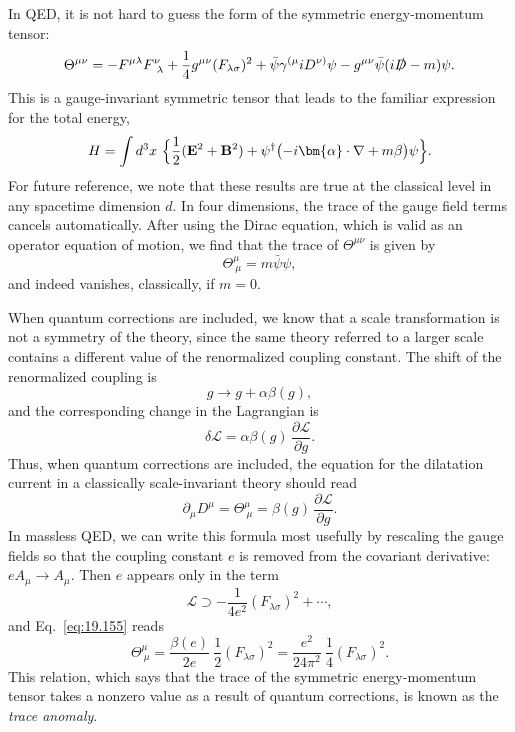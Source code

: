 In QED, it is not hard to guess the form of the symmetric energy-momentum
tensor:
\begin{equation}
  \Theta^{\mu\nu} = -F^{\mu\lambda}F^{\nu}_{\ \lambda}
    + \frac{1}{4}g^{\mu\nu}(F_{\lambda\sigma})^2
    + \bar{\psi}\gamma^{(\mu}iD^{\nu)}\psi
    - g^{\mu\nu}\bar{\psi}(i\slashed{D} - m)\psi .
  \label{eq:19.150}
\end{equation}
This is a gauge-invariant symmetric tensor that leads to the familiar
expression for the total energy,
\begin{equation}
  H = \int d^3x\ \Bigl\{ \frac{1}{2}(\mathbf{E}^2 + \mathbf{B}^2)
    + \psi^{\dagger}\bigl( -i\bm{\alpha}\cdot\nabla + m\beta \bigr)\psi
    \Bigr\} .
  \label{eq:19.151}
\end{equation}
For future reference, we note that these results are true at the classical
level in any spacetime dimension $d$.  In four dimensions, the trace of the
gauge field terms cancels automatically.  After using the Dirac equation,
which is valid as an operator equation of motion, we find that the trace of
$\Theta^{\mu\nu}$ is given by
\begin{equation}
  \Theta^\mu_{\ \mu} = m\bar{\psi}\psi ,
  \label{eq:19.152}
\end{equation}
and indeed vanishes, classically, if $m = 0$.

When quantum corrections are included, we know that a scale transformation is
not a symmetry of the theory, since the same theory referred to a larger
scale contains a different value of the renormalized coupling constant.  The
shift of the renormalized coupling is
\begin{equation}
  g \to g + \alpha\beta(g) ,
  \label{eq:19.153}
\end{equation}
and the corresponding change in the Lagrangian is
\begin{equation}
  \delta\mathcal{L} = \alpha\beta(g)\,\frac{\partial\mathcal{L}}
    {\partial g} .
  \label{eq:19.154}
\end{equation}
Thus, when quantum corrections are included, the equation for the dilatation
current in a classically scale-invariant theory should read
\begin{equation}
  \partial_\mu D^\mu = \Theta^\mu_{\ \mu} = \beta(g)\,\frac{\partial
    \mathcal{L}}{\partial g} .
  \label{eq:19.155}
\end{equation}
In massless QED, we can write this formula most usefully by rescaling the
gauge fields so that the coupling constant $e$ is removed from the covariant
derivative: $eA_\mu\to A_\mu$.  Then $e$ appears only in the term
\begin{equation}
  \mathcal{L} \supset -\frac{1}{4e^2}(F_{\lambda\sigma})^2 + \cdots ,
  \label{eq:19.156}
\end{equation}
and Eq.~\eqref{eq:19.155} reads
\begin{equation}
  \Theta^\mu_{\ \mu} = \frac{\beta(e)}{2e}\ \frac{1}{2}(F_{\lambda\sigma})^2
  = \frac{e^2}{24\pi^2}\ \frac{1}{4}(F_{\lambda\sigma})^2 .
  \label{eq:19.157}
\end{equation}
This relation, which says that the trace of the symmetric energy-momentum
tensor takes a nonzero value as a result of quantum corrections, is known as
the \emph{trace anomaly}.

